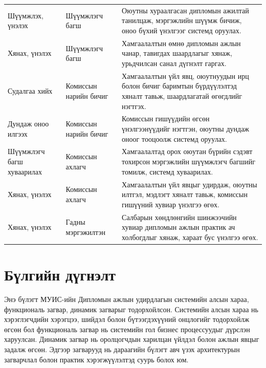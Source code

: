 \begin{longtable}{p{3 cm} p{2.5 cm} p{10.5 cm}}
\midrule
Шүүмжлэх, үнэлэх & Шүүмжлэгч багш & Оюутны хураалгасан дипломын ажилтай танилцаж, мэргэжлийн шүүмж бичиж, оноо бүхий үнэлгээг системд оруулах. \\ \addlinespace
Хянах, үнэлэх & Шүүмжлэгч багш & Хамгаалалтын өмнө дипломын ажлын чанар, тавигдах шаардлагыг хянаж, урьдчилсан санал дүгнэлт гаргах. \\ \addlinespace
\midrule
Судалгаа хийх & Комиссын нарийн бичиг & Хамгаалалтын үйл явц, оюутнуудын ирц болон бичиг баримтын бүрдүүлэлтэд хяналт тавьж, шаардлагатай өгөгдлийг нэгтгэх. \\ \addlinespace
Дундаж оноо илгээх & Комиссын нарийн бичиг & Комиссын гишүүдийн өгсөн үнэлгээнүүдийг нэгтгэн, оюутны дундаж оноог тооцоолж системд оруулах. \\ \addlinespace
\midrule
Шүүмжлэгч багш хуваарилах & Комиссын ахлагч & Хамгаалалтад орох оюутан бүрийн сэдэвт тохирсон мэргэжлийн шүүмжлэгч багшийг томилж, системд хуваарилах. \\ \addlinespace
Хянах, үнэлэх & Комиссын ахлагч & Хамгаалалтын үйл явцыг удирдаж, оюутны илтгэл, мэдлэгт хяналт тавьж, комиссын гишүүний хувиар үнэлгээ өгөх. \\ \addlinespace
\midrule
Хянах, үнэлэх & Гадны мэргэжилтэн & Салбарын хөндлөнгийн шинжээчийн хувиар дипломын ажлын практик ач холбогдлыг хянаж, хараат бус үнэлгээ өгөх. \\

\end{longtable}

\section{Бүлгийн дүгнэлт}
Энэ бүлэгт МУИС-ийн Дипломын ажлын удирдлагын системийн алсын хараа, функциональ загвар, динамик загварыг тодорхойлсон. Системийн алсын хараа нь хэрэглэгчдийн хэрэгцээ, шийдэл болон бүтээгдэхүүний онцлогийг тодорхойлж өгсөн бол функциональ загвар нь системийн гол бизнес процессуудыг дүрслэн харуулсан. Динамик загвар нь оролцогчдын харилцан үйлдэл болон ажлын явцыг задалж өгсөн. Эдгээр загварууд нь дараагийн бүлэгт авч үзэх архитектурын загварчлал болон практик хэрэгжүүлэлтэд суурь болох юм.